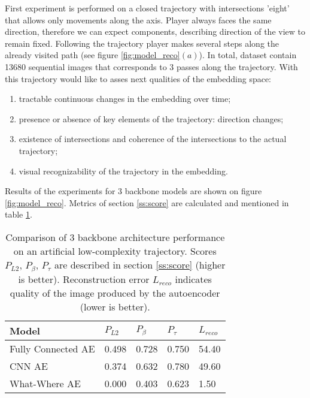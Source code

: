 First experiment is performed on a closed trajectory with intersections 'eight' that allows only movements along the axis. Player always faces the same direction, therefore we can expect components, describing direction of the view to remain fixed. Following the trajectory player makes several steps along the already visited path (see figure \ref{fig:model_reco}$(a)$). In total, dataset contain 13680 sequential images that corresponds to 3 passes along the trajectory. With this trajectory would like to asses next qualities of the embedding space:
\begin{enumerate}
  \item tractable continuous changes in the embedding over time;
  \item presence or absence of key elements of the trajectory: direction changes;
  \item existence of intersections and coherence of the intersections to the actual trajectory;
  \item visual recognizability of the trajectory in the embedding.
\end{enumerate}

Results of the experiments for 3 backbone models are shown on figure \ref{fig:model_reco}. Metrics of section \ref{ss:score} are calculated and mentioned in table \ref{tab:3demb}.


\begin{table}
\begin{center}
    \begin{tabular}{| l | l | l | l | l |}
    \hline
    Model  &  $P_{L2}$    &  $P_{\beta}$     &  $P_{\tau}$ &  $L_{reco}$ \\ \hline
    Fully Connected	 AE  & 0.498 & 0.728 & 0.750 & 54.40        \\
    CNN AE 	 & 0.374 & 0.632 & 0.780 & 49.60        \\
    What-Where AE 	   & 0.000 & 0.403 & 0.623 & 1.50         \\ \hline
    \end{tabular}
\end{center}
  \caption{Comparison of 3 backbone architecture performance on an artificial low-complexity trajectory. Scores   $P_{L2}$, $P_{\beta}$, $P_{\tau}$ are described in section \ref{ss:score} (higher is better). Reconstruction error $L_{reco}$ indicates quality of the image produced by the autoencoder (lower is better).}
  \label{tab:3demb}
\end{table}

